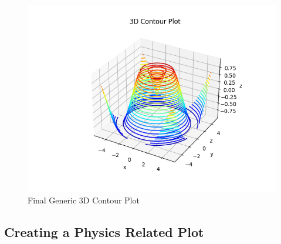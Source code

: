\documentclass[
11pt, %
a4paper, %
oneside, %
headinclude,footinclude, %
BCOR5mm, %
]{scrartcl}
\begin{document}
	\begin{figure}[H]
		\centering %
		\includegraphics[width=0.4\columnwidth]{Figures/Figure3.png} 
		\caption[Final Generic 3D Contour Plot]{Final Generic 3D Contour Plot} %
		\label{fig:gallery} 
	\end{figure}
	
\subsection{Creating a Physics Related Plot}
	
\end{document}
